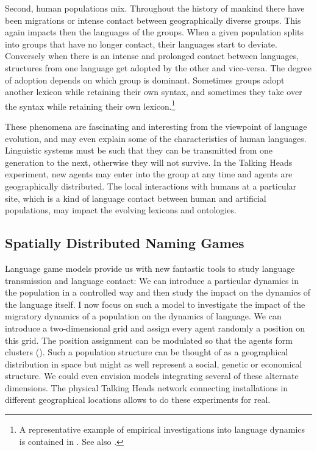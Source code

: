 Second, human populations mix. Throughout the history of 
mankind there have been migrations or intense contact 
between geographically diverse groups. This again impacts
then the languages of the groups. 
When a given population splits into groups that have no longer 
contact, their languages start to deviate. Conversely
when there is an intense and prolonged contact between languages, 
structures from one language get adopted by the other
and vice-versa. The degree of adoption depends on which 
group is dominant. Sometimes groups adopt
another lexicon while retaining their own
syntax, and sometimes they take over the syntax
while retaining their own lexicon.\footnote{
A representative example of empirical investigations into 
language dynamics is contained in \cite{Nichols:1992}. 
See also \cite{Romaine:1988}.}

These phenomena are fascinating and interesting from the viewpoint
of language evolution, and may even explain some of the characteristics
of human languages. Linguistic systems must be 
such that they can be transmitted from one generation to the next,
otherwise they will not survive. 
In the Talking Heads experiment,
new agents may enter into the group at
any time and agents are geographically distributed. 
The local interactions 
with humans at a particular site, which is a kind of language
contact between human and artificial populations, may 
impact the evolving lexicons and ontologies. 

\subsection{Spatially Distributed Naming Games}

Language game models provide us with new fantastic tools to study
language transmission and language contact: 
We can introduce a particular dynamics in the population
in a controlled way and then study the impact on the dynamics of the 
language itself. 
I now focus on such a model to investigate the impact of 
the migratory dynamics of a population on the dynamics 
of language. We can introduce a two-dimensional 
grid and assign every agent randomly
a position on this grid. The position assignment
can be modulated so that the agents form clusters
(). Such 
a population structure can be thought of as a 
geographical distribution in space but might as well 
represent a social, genetic or economical structure.
We could even envision models integrating
several of these alternate dimensions. The physical 
Talking Heads network connecting installations in 
different geographical locations allows to do these 
experiments for real. 

